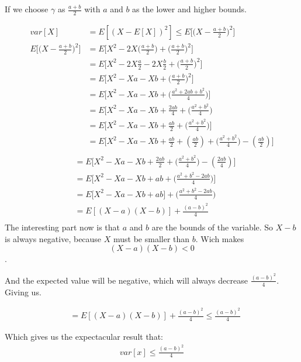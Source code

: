 \documentclass[10pt,a4paper]{article}
\begin{document}
	If we choose $\gamma$ as $\frac{a+b}{2}$ with $a$ and $b$ as the lower and higher bounds.
	
	\begin{align*}
	var[X] &= E[(X-E[X])^2] \le E \bigg[ \bigg(X-\frac{a+b}{2} \bigg)^2 \bigg]
	\\
	E \bigg[ \bigg(X-\frac{a+b}{2} \bigg)^2 \bigg] &= E \bigg[ X^2 - 2X\bigg( \frac{a+b}{2} \bigg) + \bigg(\frac{a+b}{2} \bigg)^2 \bigg]\\
	&= E \bigg[ X^2 - 2X\frac{a}{2} -2X\frac{b}{2} + \bigg(\frac{a+b}{2} \bigg)^2 \bigg]\\
	&= E \bigg[ X^2 -Xa -Xb + \bigg(\frac{a+b}{2} \bigg)^2 \bigg]\\
	&= E \bigg[ X^2 -Xa -Xb + \bigg(\frac{a^2+2ab+b^2}{4} \bigg) \bigg]\\	
	&= E \bigg[ X^2 -Xa -Xb + \frac{2ab}{4} + \bigg(\frac{a^2+b^2}{4} \bigg)\\
	&= E \bigg[ X^2 -Xa -Xb + \frac{ab}{2} + \bigg(\frac{a^2+b^2}{4} \bigg)	 \bigg]\\		
	&= E \bigg[ X^2 -Xa -Xb + \frac{ab}{2} + (\frac{ab}{2}) + \bigg(\frac{a^2+b^2}{4} \bigg) - (\frac{ab}{2}) \bigg]\\
	\end{align*}
	\begin{align*}
	&= E \bigg[ X^2 -Xa -Xb + \frac{2ab}{2} + \bigg(\frac{a^2+b^2}{4} \bigg) - (\frac{2ab}{4}) \bigg]\\
	&= E \bigg[ X^2 -Xa -Xb + ab + \bigg(\frac{a^2+b^2-2ab}{4} \bigg) \bigg]\\	
	&= E \bigg[ X^2 -Xa -Xb + ab \bigg] + \bigg(\frac{a^2+b^2-2ab}{4} \bigg)\\	
	&= E [ (X-a)(X-b) ] + \frac{(a-b)^2}{4}\\	
	\end{align*}
	The interesting part now is that $a$ and $b$ are the bounds of the variable. So $X-b$ is always negative, because $X$ must be smaller than $b$. Wich makes
	$$(X-a)(X-b) < 0$$.
	
	And the expected value will be negative, which will always decrease $\frac{(a-b)^2}{4}$. Giving us.
	
	\begin{align*}
		&= E [ (X-a)(X-b) ] + \frac{(a-b)^2}{4} \le \frac{(a-b)^2}{4}
	\end{align*}
	
	Which gives us the expectacular result that:
	\begin{align*}
		var[x] \le \frac{(a-b)^2}{4}
	\end{align*}
	
\end{document}
